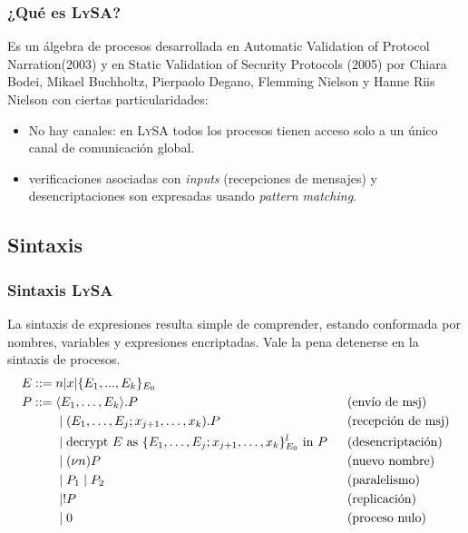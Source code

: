 \documentclass{beamer}
\begin{document}
\begin{frame}
    \frametitle{¿Qué es L\textsc{y}S\textsc{A}?}
    \pause
    Es un álgebra de procesos desarrollada en Automatic Validation of Protocol Narration(2003) y en Static Validation of Security Protocols (2005) por Chiara Bodei, Mikael Buchholtz, Pierpaolo Degano, Flemming Nielson y Hanne Riis Nielson con ciertas particularidades:
    \pause[2]
    \begin{itemize}
        \item<3-> No hay canales: en L\textsc{y}S\textsc{A} todos los procesos tienen acceso solo a un único canal de comunicación global. 
        \item<4-> verificaciones asociadas con \textit{inputs} (recepciones de mensajes) y desencriptaciones son expresadas usando \textit{pattern matching}.

    \end{itemize}

\end{frame}

\subsection{Sintaxis}

\begin{frame}
    \frametitle{Sintaxis L\textsc{y}S\textsc{A}}
    \pause
    La sintaxis de expresiones resulta simple de comprender, estando conformada por nombres, variables y expresiones encriptadas. Vale la pena detenerse en la sintaxis de procesos.
    \pause[3]
    \begin{align*}
    E &::= n | x | \{ E_1, ..., E_k \}_{E_0}\\
    P &::= \begin{aligned}[t]
            &\langle E_1, \dots, E_k \rangle.P \hspace{0.2cm}
            &&\text{(envío de msj)} \\
            &\mid (E_1, \ldots, E_j; x_{j+1}, \ldots, x_k).P \hspace{0.1cm} &&\text{(recepción de msj)} \\
            &\mid \text{decrypt } E \text{ as } \{E_1, \ldots, E_j; x_{j+1}, \ldots, x_k\}^{l}_{E_0} \text{ in } P \hspace{0.2cm} &&\text{(desencriptación)} \\
            &\mid (\nu n)P \hspace{0.2cm} &&\text{(nuevo nombre)}\\ 
            &\mid P_1 \mid P_2 \hspace{0.2cm} &&\text{(paralelismo)}\\
            &\mid !P \hspace{0.2cm} &&\text{(replicación)}\\ 
            &\mid 0 \hspace{0.2cm} &&\text{(proceso nulo)}\\
        \end{aligned}
\end{align*}
\end{frame}
\end{document}
